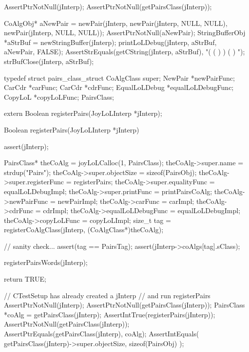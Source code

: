 
\startCTest
  AssertPtrNotNull(jInterp);
  AssertPtrNotNull(getPairsClass(jInterp));

  CoAlgObj* aNewPair = newPair(jInterp,
                               newPair(jInterp, NULL, NULL),
                               newPair(jInterp, NULL, NULL));
  AssertPtrNotNull(aNewPair);
  StringBufferObj *aStrBuf = newStringBuffer(jInterp);
  printLoLDebug(jInterp, aStrBuf, aNewPair, FALSE);
  AssertStrEquals(getCString(jInterp, aStrBuf), "( ( ) ) ( ) ");
  strBufClose(jInterp, aStrBuf);
\stopCTest
\stopTestCase
\stopTestSuite

\startTestSuite[registerPairs]

\startCHeader
typedef struct pairs_class_struct {
  CoAlgClass     super;
  NewPair       *newPairFunc;
  CarCdr        *carFunc;
  CarCdr        *cdrFunc;
  EqualLoLDebug *equalLoLDebugFunc;
  CopyLoL       *copyLoLFunc;
} PairsClass;
\stopCHeader

\startCHeader
extern Boolean registerPairs(JoyLoLInterp *jInterp);
\stopCHeader
{}

\startCCode
Boolean registerPairs(JoyLoLInterp *jInterp) {
  assert(jInterp);
  
  PairsClass* theCoAlg         = joyLoLCalloc(1, PairsClass);
  theCoAlg->super.name         = strdup("Pairs");
  theCoAlg->super.objectSize   = sizeof(PairsObj);
  theCoAlg->super.registerFunc = registerPairs;
  theCoAlg->super.equalityFunc = equalLoLDebugImpl;
  theCoAlg->super.printFunc    = printPairsCoAlg;
  theCoAlg->newPairFunc        = newPairImpl;
  theCoAlg->carFunc            = carImpl;
  theCoAlg->cdrFunc            = cdrImpl;
  theCoAlg->equalLoLDebugFunc  = equalLoLDebugImpl;
  theCoAlg->copyLoLFunc        = copyLoLImpl;
  size_t tag =
    registerCoAlgClass(jInterp, (CoAlgClass*)theCoAlg);
  
  // sanity check...
  assert(tag == PairsTag);
  assert(jInterp->coAlgs[tag].sClass);
    
  registerPairsWords(jInterp);
  
  return TRUE;
}
\stopCCode


\startCTest
  // CTestSetup has already created a jInterp
  // and run registerPairs
  AssertPtrNotNull(jInterp);
  AssertPtrNotNull(getPairsClass(jInterp));
  PairsClass *coAlg = getPairsClass(jInterp);
  AssertIntTrue(registerPairs(jInterp));
  AssertPtrNotNull(getPairsClass(jInterp));
  AssertPtrEquals(getPairsClass(jInterp), coAlg);
  AssertIntEquals(
    getPairsClass(jInterp)->super.objectSize,
    sizeof(PairsObj)
  );
\stopCTest
\stopTestCase
\stopTestSuite

